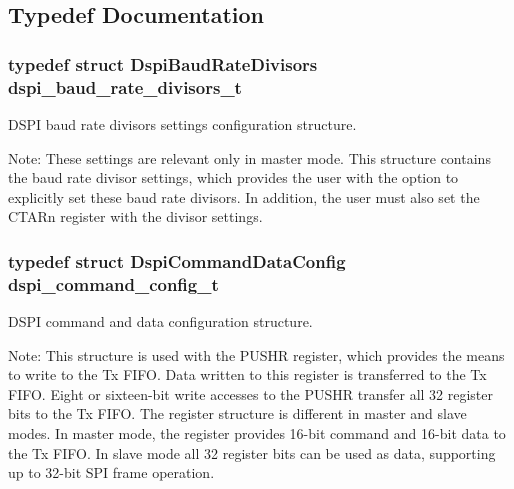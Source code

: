 \subsection{Typedef Documentation}
\subsubsection[{\texorpdfstring{dspi\+\_\+baud\+\_\+rate\+\_\+divisors\+\_\+t}{dspi_baud_rate_divisors_t}}]{\setlength{\rightskip}{0pt plus 5cm}typedef struct {\bf Dspi\+Baud\+Rate\+Divisors}  {\bf dspi\+\_\+baud\+\_\+rate\+\_\+divisors\+\_\+t}}\hypertarget{group__dspi__hal_ga6426ca15a4ec2fd17077db5a401737e5}{}\label{group__dspi__hal_ga6426ca15a4ec2fd17077db5a401737e5}


D\+S\+PI baud rate divisors settings configuration structure. 

Note\+: These settings are relevant only in master mode. This structure contains the baud rate divisor settings, which provides the user with the option to explicitly set these baud rate divisors. In addition, the user must also set the C\+T\+A\+Rn register with the divisor settings. 
\subsubsection[{\texorpdfstring{dspi\+\_\+command\+\_\+config\+\_\+t}{dspi_command_config_t}}]{\setlength{\rightskip}{0pt plus 5cm}typedef struct {\bf Dspi\+Command\+Data\+Config}  {\bf dspi\+\_\+command\+\_\+config\+\_\+t}}\hypertarget{group__dspi__hal_gaaf494c415fa4baf4998efa41992e85ce}{}\label{group__dspi__hal_gaaf494c415fa4baf4998efa41992e85ce}


D\+S\+PI command and data configuration structure. 

Note\+: This structure is used with the P\+U\+S\+HR register, which provides the means to write to the Tx F\+I\+FO. Data written to this register is transferred to the Tx F\+I\+FO. Eight or sixteen-\/bit write accesses to the P\+U\+S\+HR transfer all 32 register bits to the Tx F\+I\+FO. The register structure is different in master and slave modes. In master mode, the register provides 16-\/bit command and 16-\/bit data to the Tx F\+I\+FO. In slave mode all 32 register bits can be used as data, supporting up to 32-\/bit S\+PI frame operation. 
